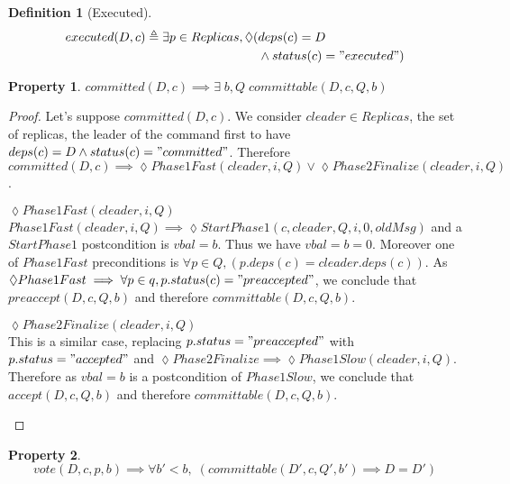\documentclass[a4paper]{article}
\theoremstyle{definition}
\newtheorem{definition}{Definition}
\theoremstyle{plain}
\newtheorem{property}{Property}
\begin{document}
\begin{definition}[Executed]
\begin{align*}
    executed(D,c) \triangleq  \exists p \in Replicas, \lozenge(& deps(c) = D \\
                                                                &\wedge status(c) = "executed") 
\end{align*}

\end{definition}





\begin{property}
$committed(D,c) \implies \exists \; b,Q  \; committable(D,c,Q,b)$
\end{property}

\begin{proof}
Let's suppose $committed(D,c)$. We consider $cleader \in Replicas$, the set of replicas, the leader of the command first to have $deps(c) = D \wedge status(c) = "committed"$. Therefore $committed(D,c) \implies \lozenge Phase1Fast(cleader,i,Q) \vee \lozenge Phase2Finalize(cleader,i,Q)$.

\begin{case}
    \item $\lozenge Phase1Fast(cleader,i,Q)$\\
    $Phase1Fast(cleader,i,Q) \implies \lozenge StartPhase1(c,cleader,Q,i,0,oldMsg)$ and a $StartPhase1$ postcondition is $vbal=b$. Thus we have $vbal=b=0$. Moreover one of $Phase1Fast$ preconditions is $\forall p \in Q, (p.deps(c) = cleader.deps(c))$. As $\lozenge Phase1Fast \implies \forall p \in q, p.status(c) = "preaccepted"$, we conclude that $preaccept(D,c,Q,b)$ and therefore $committable(D,c,Q,b)$.
    
    \item $\lozenge Phase2Finalize(cleader,i,Q)$\\
    This is a similar case, replacing $p.status="preaccepted"$ with $p.status="accepted"$ and $\lozenge Phase2Finalize \implies \lozenge Phase1Slow(cleader,i,Q)$. Therefore as $vbal=b$ is a postcondition of $Phase1Slow$, we conclude that $accept(D,c,Q,b)$ and therefore $committable(D,c,Q,b)$.
\end{case}
\end{proof}

\begin{property}
\begin{equation*}
    vote(D,c,p,b) \implies \forall b'<b, \; (committable(D',c,Q',b') \implies D=D')
\end{equation*}
\end{property}
\end{document}

